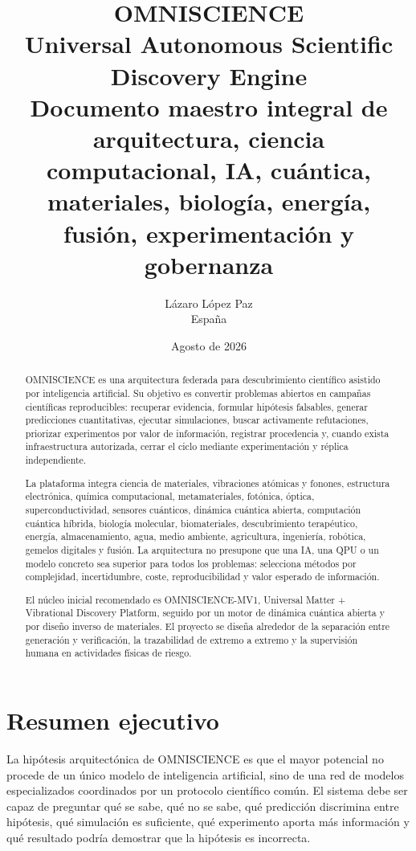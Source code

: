 \documentclass[11pt,a4paper]{article}
\title{\textbf{OMNISCIENCE}\\\large Universal Autonomous Scientific Discovery Engine\\[0.3cm]\normalsize Documento maestro integral de arquitectura, ciencia computacional, IA, cuántica, materiales, biología, energía, fusión, experimentación y gobernanza}
\author{Lázaro López Paz\\España}
\date{Agosto de 2026}
\begin{document}
\maketitle

\begin{abstract}
OMNISCIENCE es una arquitectura federada para descubrimiento científico asistido por inteligencia artificial. Su objetivo es convertir problemas abiertos en campañas científicas reproducibles: recuperar evidencia, formular hipótesis falsables, generar predicciones cuantitativas, ejecutar simulaciones, buscar activamente refutaciones, priorizar experimentos por valor de información, registrar procedencia y, cuando exista infraestructura autorizada, cerrar el ciclo mediante experimentación y réplica independiente.

La plataforma integra ciencia de materiales, vibraciones atómicas y fonones, estructura electrónica, química computacional, metamateriales, fotónica, óptica, superconductividad, sensores cuánticos, dinámica cuántica abierta, computación cuántica híbrida, biología molecular, biomateriales, descubrimiento terapéutico, energía, almacenamiento, agua, medio ambiente, agricultura, ingeniería, robótica, gemelos digitales y fusión. La arquitectura no presupone que una IA, una QPU o un modelo concreto sea superior para todos los problemas: selecciona métodos por complejidad, incertidumbre, coste, reproducibilidad y valor esperado de información.

El núcleo inicial recomendado es OMNISCIENCE-MV1, Universal Matter + Vibrational Discovery Platform, seguido por un motor de dinámica cuántica abierta y por diseño inverso de materiales. El proyecto se diseña alrededor de la separación entre generación y verificación, la trazabilidad de extremo a extremo y la supervisión humana en actividades físicas de riesgo.
\end{abstract}

\tableofcontents\newpage

\section{Resumen ejecutivo}
La hipótesis arquitectónica de OMNISCIENCE es que el mayor potencial no procede de un único modelo de inteligencia artificial, sino de una red de modelos especializados coordinados por un protocolo científico común. El sistema debe ser capaz de preguntar qué se sabe, qué no se sabe, qué predicción discrimina entre hipótesis, qué simulación es suficiente, qué experimento aporta más información y qué resultado podría demostrar que la hipótesis es incorrecta.
\end{document}
